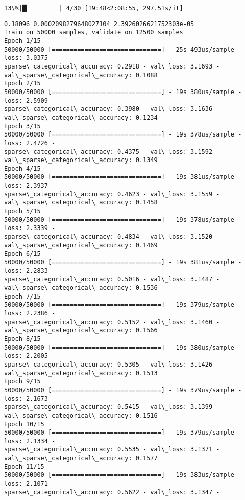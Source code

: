 \documentclass[11pt]{article}
\begin{document}
    \begin{Verbatim}[commandchars=\\\{\}]
 13\%|█▎        | 4/30 [19:48<2:08:55, 297.51s/it]
    \end{Verbatim}

    \begin{Verbatim}[commandchars=\\\{\}]
0.18096 0.0002098279648027104 2.3926026621752303e-05
Train on 50000 samples, validate on 12500 samples
Epoch 1/15
50000/50000 [==============================] - 25s 493us/sample - loss: 3.0375 -
sparse\_categorical\_accuracy: 0.2918 - val\_loss: 3.1693 -
val\_sparse\_categorical\_accuracy: 0.1088
Epoch 2/15
50000/50000 [==============================] - 19s 380us/sample - loss: 2.5909 -
sparse\_categorical\_accuracy: 0.3980 - val\_loss: 3.1636 -
val\_sparse\_categorical\_accuracy: 0.1234
Epoch 3/15
50000/50000 [==============================] - 19s 378us/sample - loss: 2.4726 -
sparse\_categorical\_accuracy: 0.4375 - val\_loss: 3.1592 -
val\_sparse\_categorical\_accuracy: 0.1349
Epoch 4/15
50000/50000 [==============================] - 19s 381us/sample - loss: 2.3937 -
sparse\_categorical\_accuracy: 0.4623 - val\_loss: 3.1559 -
val\_sparse\_categorical\_accuracy: 0.1458
Epoch 5/15
50000/50000 [==============================] - 19s 378us/sample - loss: 2.3339 -
sparse\_categorical\_accuracy: 0.4834 - val\_loss: 3.1520 -
val\_sparse\_categorical\_accuracy: 0.1469
Epoch 6/15
50000/50000 [==============================] - 19s 381us/sample - loss: 2.2833 -
sparse\_categorical\_accuracy: 0.5016 - val\_loss: 3.1487 -
val\_sparse\_categorical\_accuracy: 0.1536
Epoch 7/15
50000/50000 [==============================] - 19s 379us/sample - loss: 2.2386 -
sparse\_categorical\_accuracy: 0.5152 - val\_loss: 3.1460 -
val\_sparse\_categorical\_accuracy: 0.1566
Epoch 8/15
50000/50000 [==============================] - 19s 380us/sample - loss: 2.2005 -
sparse\_categorical\_accuracy: 0.5305 - val\_loss: 3.1426 -
val\_sparse\_categorical\_accuracy: 0.1513
Epoch 9/15
50000/50000 [==============================] - 19s 379us/sample - loss: 2.1673 -
sparse\_categorical\_accuracy: 0.5415 - val\_loss: 3.1399 -
val\_sparse\_categorical\_accuracy: 0.1516
Epoch 10/15
50000/50000 [==============================] - 19s 379us/sample - loss: 2.1334 -
sparse\_categorical\_accuracy: 0.5535 - val\_loss: 3.1371 -
val\_sparse\_categorical\_accuracy: 0.1577
Epoch 11/15
50000/50000 [==============================] - 19s 383us/sample - loss: 2.1071 -
sparse\_categorical\_accuracy: 0.5622 - val\_loss: 3.1347 -

\end{Verbatim}
\end{document}
